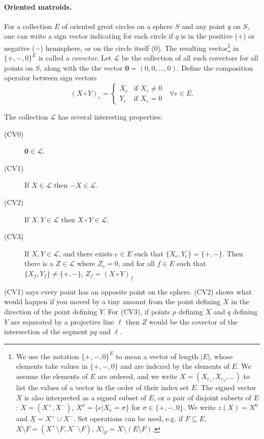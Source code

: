 \documentclass[leqno,12pt]{article}
\def\L{\mathcal{L}}
\def\orig{\mathbf{0}}
\begin{document}
\paragraph{Oriented matroids.}
For a collection $E$ of
 oriented great circles on a sphere $S$ and any
point $q$ on $S$, one 
can write a sign vector indicating for each circle if $q$ is in
the positive ($+$) or negative ($-$) hemisphere, or on the
circle itself ($0$). The resulting vector\footnote{We use the notation
  $\{+,-,0\}^E$ to mean a vector of length $|E|$, whose elements take
  values in $\{+,-,0\}$ and are indexed by the elements of $E$. We
  assume the elements of $E$ are ordered, and we write $X = (X_{e_1},X_{e_2},...)$
  to list the values of a vector in the order of their index set
  $E$. The signed vector $X$ is also interpreted as a signed subset of
  $E$, or a pair of disjoint subsets of $E$: $X=(X^+,X^-)$,
  $X^\sigma=\{e|X_e=\sigma\}$ for $\sigma\in\{+,-,0\}$. We write
  $z(X) = X^0$ and $\underline{X} = X^+ \cup X^-$. 
  Set operations can be used, e.g. if $F\subseteq E$, 
  $X\setminus F = (X^+\setminus F, X^-\setminus F)$, 
  $X|_F = X\setminus(E\setminus F)$.
}   
in $\{+,-,0\}^E$ is called a
\emph{covector}. Let $\L$ be the collection of 
all  such 
covectors for
all points on $S$,  along with the
 the vector
 $\orig=(0,0,\ldots,0)$.
Define the composition operator between sign vectors
  \[(X \circ Y)_e = 
  \begin{cases}
    X_e & \text{if } X_e \neq 0 \\
    Y_e & \text{if } X_e = 0
  \end{cases}
  \text{  }\forall e\in E.
  \]

\noindent The collection $\L$ has several interesting properties:
\begin{description}
\item[(CV0)] $\orig\in\L$.
\item[(CV1)] If $X\in\L$ then $-X\in\L$.
\item[(CV2)] If $X,Y\in\L$ then $X\circ Y\in\L$.
\item[(CV3)] If $X,Y\in\L$, and there exists $e\in E$ such that $\{X_e,Y_e\} = \{+,-\}$. 
Then there is a $Z\in\L$ where $Z_e=0$, and for all $f\in E$ such
  that $\{X_f,Y_f\} \neq \{+,-\}$, $Z_f = (X \circ Y)_f$
\end{description}
(CV1) says every point has an opposite point on the sphere. (CV2) shows
what would happen if you moved by a tiny amount from the point
defining $X$ in the direction of the point defining $Y$. For (CV3), if
points $p$ defining $X$ and $q$ defining $Y$ are separated by 
a projective line $\ell$ then $Z$ would be the covector of the
intersection of the segment $pq$ and $\ell$.
\end{document}
